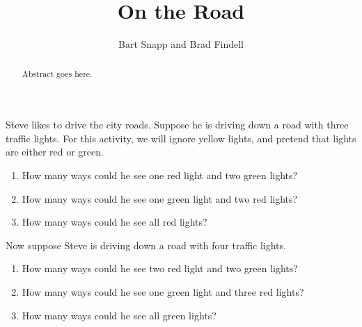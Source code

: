 \documentclass{ximera}
\title{On the Road}
\author{Bart Snapp and Brad Findell}
\begin{document}
\begin{abstract}
Abstract goes here.  
\end{abstract}
\maketitle

\label{A:traffic}

\begin{problem} 
Steve likes to drive the city roads. Suppose he is driving down a road
with three traffic lights. For this activity, we will ignore yellow
lights, and pretend that lights are either red or green.
\begin{enumerate}
\item How many ways could he see one red light and two green lights?
\item How many ways could he see one green light and two red lights?
\item How many ways could he see all red lights?
\end{enumerate}
\end{problem}

\begin{problem} 
Now suppose Steve is driving down a road with four traffic lights.
\begin{enumerate}
\item How many ways could he see two red light and two green lights?
\item How many ways could he see one green light and three red lights?
\item How many ways could he see all green lights?
\end{enumerate}
\end{problem}
\end{document}
